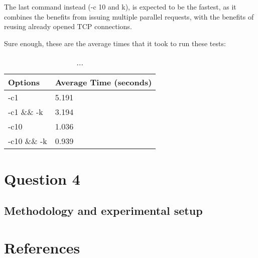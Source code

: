 \documentclass[a4paper,10pt]{article}
\begin{document}
The last command instead (-c 10 and k), is expected to be the fastest, as it combines the benefits from issuing multiple parallel requests, with the benefits of reusing already opened TCP connections.

Sure enough, these are the average times that it took to run these tests:




\begin{table}[h!]
\centering
\begin{tabular}{|l|l|}
\hline
Options      & Average Time (seconds) \\ \hline
-c1          & 5.191        \\ \hline
-c1 \&\& -k  & 3.194        \\ \hline
-c10         & 1.036        \\ \hline
-c10 \&\& -k & 0.939        \\ \hline



\end{tabular}

\caption{...}
\label{fig:table3}

\end{table}



\section{Question 4}
\subsection{Methodology and experimental setup}

\clearpage


\section{References}
\end{document}
